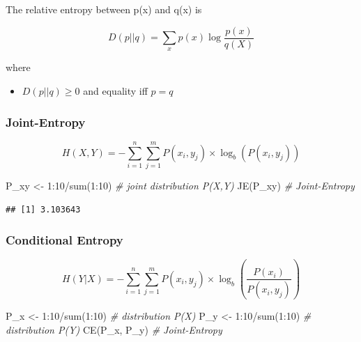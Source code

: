 \documentclass[
]{book}
\newenvironment{Shaded}{\begin{snugshade}}{\end{snugshade}}
\newcommand{\CommentTok}[1]{\textcolor[rgb]{0.56,0.35,0.01}{\textit{#1}}}
\newcommand{\DecValTok}[1]{\textcolor[rgb]{0.00,0.00,0.81}{#1}}
\newcommand{\FunctionTok}[1]{\textcolor[rgb]{0.00,0.00,0.00}{#1}}
\newcommand{\NormalTok}[1]{#1}
\newcommand{\OtherTok}[1]{\textcolor[rgb]{0.56,0.35,0.01}{#1}}
\newcommand{\SpecialCharTok}[1]{\textcolor[rgb]{0.00,0.00,0.00}{#1}}
\providecommand{\tightlist}{%
  \setlength{\itemsep}{0pt}\setlength{\parskip}{0pt}}
\begin{document}
The relative entropy between p(x) and q(x) is

\[
D(p||q) = \sum_x p(x) \log \frac{p(x)}{q(X)}
\]

where

\begin{itemize}
\tightlist
\item
  \(D(p||q) \ge 0\) and equality iff \(p = q\)
\end{itemize}

\hypertarget{joint-entropy}{%
\subsubsection{Joint-Entropy}\label{joint-entropy}}

\[
H(X,Y) = - \sum_{i=1}^n \sum_{j = 1}^m P(x_i, y_j) \times \log_b(P(x_i,y_j))
\]

\begin{Shaded}
\begin{Highlighting}[]
\NormalTok{P\_xy }\OtherTok{\textless{}{-}} \DecValTok{1}\SpecialCharTok{:}\DecValTok{10}\SpecialCharTok{/}\FunctionTok{sum}\NormalTok{(}\DecValTok{1}\SpecialCharTok{:}\DecValTok{10}\NormalTok{) }\CommentTok{\# joint distribution P(X,Y)}
\FunctionTok{JE}\NormalTok{(P\_xy) }\CommentTok{\# Joint{-}Entropy}
\end{Highlighting}
\end{Shaded}

\begin{verbatim}
## [1] 3.103643
\end{verbatim}

\hypertarget{conditional-entropy}{%
\subsubsection{Conditional Entropy}\label{conditional-entropy}}

\[
H(Y|X) = - \sum_{i=1}^n \sum_{j = 1}^m P(x_i, y_j) \times \log_b(\frac{P(x_i)}{P(x_i,y_j)})
\]

\begin{Shaded}
\begin{Highlighting}[]
\NormalTok{P\_x }\OtherTok{\textless{}{-}} \DecValTok{1}\SpecialCharTok{:}\DecValTok{10}\SpecialCharTok{/}\FunctionTok{sum}\NormalTok{(}\DecValTok{1}\SpecialCharTok{:}\DecValTok{10}\NormalTok{) }\CommentTok{\# distribution P(X)}
\NormalTok{P\_y }\OtherTok{\textless{}{-}} \DecValTok{1}\SpecialCharTok{:}\DecValTok{10}\SpecialCharTok{/}\FunctionTok{sum}\NormalTok{(}\DecValTok{1}\SpecialCharTok{:}\DecValTok{10}\NormalTok{) }\CommentTok{\# distribution P(Y)}
\FunctionTok{CE}\NormalTok{(P\_x, P\_y) }\CommentTok{\# Joint{-}Entropy}
\end{Highlighting}
\end{Shaded}
\end{document}

